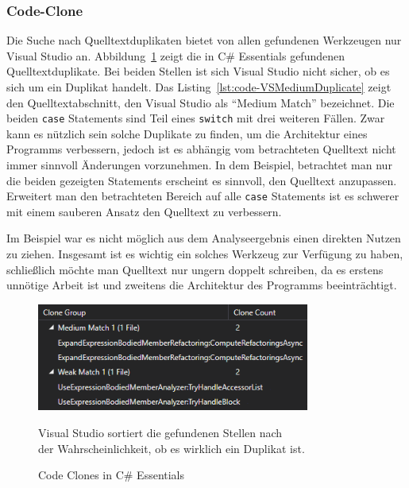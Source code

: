 \subsubsection{Code-Clone}
Die Suche nach Quelltextduplikaten bietet von allen gefundenen Werkzeugen nur Visual Studio an. Abbildung~\ref{fig:vs-code-clones} zeigt die in C\# Essentials gefundenen Quelltextduplikate. Bei beiden Stellen ist sich Visual Studio nicht sicher, ob es sich um ein Duplikat handelt. Das Listing~\ref{lst:code-VSMediumDuplicate} zeigt den Quelltextabschnitt, den Visual Studio als \enquote{Medium Match} bezeichnet. Die beiden \texttt{case} Statements sind Teil eines \texttt{switch} mit drei weiteren Fällen. Zwar kann es nützlich sein solche Duplikate zu finden, um die Architektur eines Programms verbessern, jedoch ist es abhängig vom betrachteten Quelltext nicht immer sinnvoll Änderungen vorzunehmen. In dem Beispiel, betrachtet man nur die beiden gezeigten Statements erscheint es sinnvoll, den Quelltext anzupassen. Erweitert man den betrachteten Bereich auf alle \texttt{case} Statements ist es schwerer mit einem sauberen Ansatz den Quelltext zu verbessern.

Im Beispiel war es nicht möglich aus dem Analyseergebnis einen direkten Nutzen zu ziehen. Insgesamt ist es wichtig ein solches Werkzeug zur Verfügung zu haben, schließlich möchte man Quelltext nur ungern doppelt schreiben, da es erstens unnötige Arbeit ist und zweitens die Architektur des Programms beeinträchtigt.

\begin{figure}[!ht]
	\centering
	\includegraphics[width=0.8\textwidth]{images/vs-code-clones.png}
	\caption{Code Clones in C\# Essentials}
	\vspace{0.1cm}
	Visual Studio sortiert die gefundenen Stellen nach\\ der Wahrscheinlichkeit, ob es wirklich ein Duplikat ist.
	\label{fig:vs-code-clones}
\end{figure}

